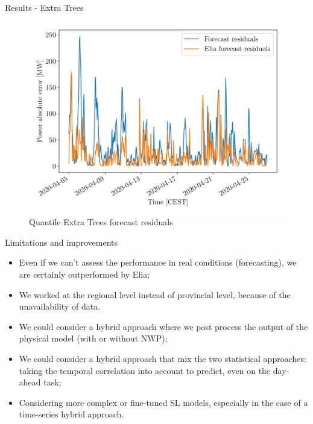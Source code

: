 \documentclass[12pt]{beamer}
\begin{document}
\begin{frame}{Results - Extra Trees}
	\begin{figure}
		\centering
		\includegraphics[width=.9\textwidth]{resources/pdf/wind_res_qxt.pdf}
		\vspace{-1em}
		\caption{Quantile Extra Trees forecast residuals}
	\end{figure}
\end{frame}

\begin{frame}{Limitations and improvements}
	\begin{itemize}
		\item Even if we can't assess the performance in real conditions (forecasting), we are certainly \alert{outperformed by Elia};
		\item We worked at the \alert{regional level} instead of provincial level, because of the \alert{unavailability of data}.
	\end{itemize}
	\begin{itemize}
		\item We could consider a \alert{hybrid approach} where we post process the output of the physical model (with or without NWP);
		\item  We could consider a hybrid approach that mix the \alert{two statistical approaches}: taking the temporal correlation into account to predict, even on the day-ahead task;
		\item Considering \alert{more complex} or fine-tuned \alert{SL models}, especially in the case of a time-series hybrid approach.
	\end{itemize}
\end{frame}
\end{document}
